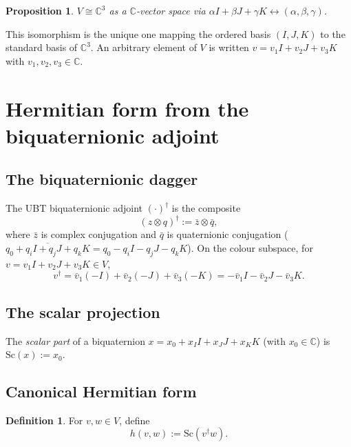 \documentclass[12pt,a4paper]{article}
\newtheorem{proposition}[theorem]{Proposition}
\theoremstyle{definition}
\newtheorem{definition}[theorem]{Definition}
\theoremstyle{remark}
\begin{document}
\begin{proposition}\label{prop:V_iso}
$V \cong \mathbb{C}^3$ as a $\mathbb{C}$-vector space via
$\alpha I+\beta J+\gamma K \leftrightarrow (\alpha,\beta,\gamma)$.
\end{proposition}

This isomorphism is the unique one mapping the ordered basis $(I,J,K)$ to the
standard basis of $\mathbb{C}^3$.  An arbitrary element of $V$ is written
$v = v_1 I + v_2 J + v_3 K$ with $v_1,v_2,v_3\in\mathbb{C}$.

\section{Hermitian form from the biquaternionic adjoint}
\label{sec:hermitian}

\subsection{The biquaternionic dagger}

The UBT biquaternionic adjoint $(\cdot)^\dagger$ is the composite
\begin{equation}\label{eq:dagger}
  (z\otimes q)^\dagger := \bar{z}\otimes\bar{q},
\end{equation}
where $\bar{z}$ is complex conjugation and $\bar{q}$ is quaternionic
conjugation ($\overline{q_0+q_i I+q_j J+q_k K}=q_0-q_i I-q_j J-q_k K$).
On the colour subspace, for $v = v_1 I+v_2 J+v_3 K\in V$,
\begin{equation}
  v^\dagger = \bar{v}_1(-I)+\bar{v}_2(-J)+\bar{v}_3(-K)
            = -\bar{v}_1 I -\bar{v}_2 J -\bar{v}_3 K.
\end{equation}

\subsection{The scalar projection}

The \emph{scalar part} of a biquaternion $x = x_0 + x_I I + x_J J + x_K K$
(with $x_0\in\mathbb{C}$) is $\mathrm{Sc}(x) := x_0$.

\subsection{Canonical Hermitian form}

\begin{definition}\label{def:h}
For $v,w\in V$, define
\begin{equation}\label{eq:h_def}
  h(v,w) := \mathrm{Sc}(v^\dagger w).
\end{equation}
\end{definition}
\end{document}
